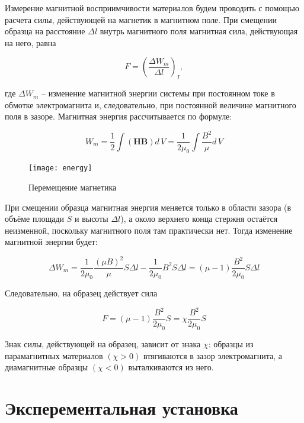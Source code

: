 \documentclass[a4paper,12pt]{article}
\begin{document}
Измерение магнитной восприимчивости материалов будем проводить с помощью расчета силы, действующей на магнетик в магнитном поле. При смещении образца на расстояние $ \Delta l $ внутрь магнитного поля магнитная сила, действующая на него, равна
	
\begin{equation}
    F = \left(\frac{\Delta W_m}{\Delta l}\right)_I,
\end{equation}

где $\Delta W_m$ -- изменение магнитной энергии системы при постоянном токе
в обмотке электромагнита и, следовательно, при постоянной величине
магнитного поля в зазоре.
Магнитная энергия рассчитывается по формуле:

\begin{equation*}
    W_m = \frac{1}{2} \int (\mathbf{H}\mathbf{B})d\,V = \frac{1}{2\mu_0}\int\frac{B^2}{\mu}d\,V
\end{equation*}

\begin{figure}
    \centering
    \texttt{[image: energy]}
    \caption{Перемещение магнетика}
    \label{pic:1}
\end{figure}


 При смещении образца магнитная энергия меняется только в области зазора (в объёме площади $ S $ и высоты $ \Delta l $), а около верхнего конца стержня остаётся неизменной, поскольку магнитного поля там практически нет. Тогда изменение магнитной энергии будет:

\begin{equation*}
    \Delta W_m = \frac{1}{2\mu_0} \frac{(\mu B)^2}{\mu} S \Delta l - \frac{1}{2\mu_0} B^2 S \Delta l = (\mu - 1) \frac{B^2}{2\mu_0} S \Delta l
\end{equation*}

Следовательно, на образец действует сила

\begin{equation}\label{eq:1}
    F = (\mu - 1)\frac{B^2}{2\mu_0}S = \chi\frac{B^2}{2\mu_0}S  
\end{equation}

Знак силы, действующей на образец, зависит от знака $\chi$: образцы из парамагнитных материалов $(\chi  > 0)$ втягиваются в зазор электромагнита, а диамагнитные образцы $(\chi < 0)$ выталкиваются из него.

\section{Эксперементальная установка}
\end{document}
